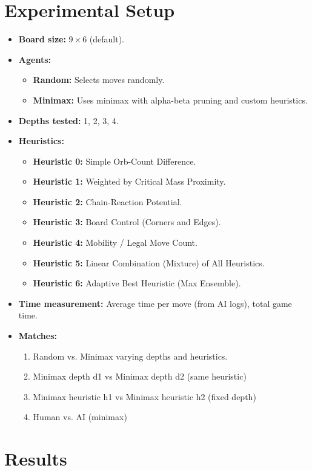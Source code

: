 \documentclass[11pt,a4paper]{article}
\begin{document}
\section{Experimental Setup}
\begin{itemize}
  \item \textbf{Board size:} $9\times6$ (default).
  \item \textbf{Agents:}
    \begin{itemize}
      \item \textbf{Random:} Selects moves randomly.
      \item \textbf{Minimax:} Uses minimax with alpha-beta pruning and custom heuristics.
    \end{itemize}
  \item \textbf{Depths tested:} 1, 2, 3, 4.
  \item \textbf{Heuristics:}
    \begin{itemize}
      \item \textbf{Heuristic 0:} Simple Orb-Count Difference.
      \item \textbf{Heuristic 1:} Weighted by Critical Mass Proximity.
      \item \textbf{Heuristic 2:} Chain-Reaction Potential.
      \item \textbf{Heuristic 3:} Board Control (Corners and Edges).
      \item \textbf{Heuristic 4:} Mobility / Legal Move Count.
      \item \textbf{Heuristic 5:} Linear Combination (Mixture) of All Heuristics.
      \item \textbf{Heuristic 6:} Adaptive Best Heuristic (Max Ensemble).
    \end{itemize}
  \item \textbf{Time measurement:} Average time per move (from AI logs), total game time.
  \item \textbf{Matches:}
    \begin{enumerate}
      \item Random vs. Minimax varying depths and heuristics.
      \item Minimax depth d1 vs Minimax depth d2 (same heuristic)
      \item Minimax heuristic h1 vs Minimax heuristic h2 (fixed depth)
      \item Human vs. AI (minimax)
    \end{enumerate}
\end{itemize}

\section{Results}
\end{document}
